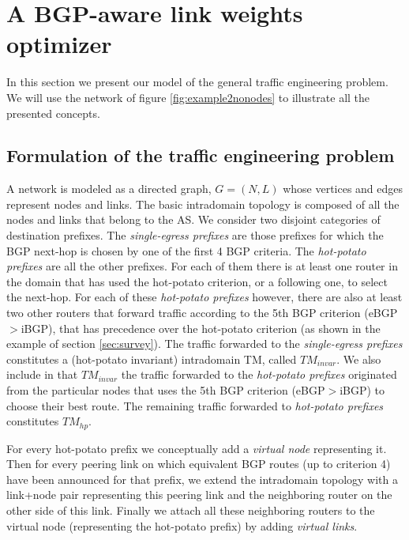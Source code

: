 \documentclass{acm_proc_article-sp}
\begin{document}
\section{A BGP-aware link weights optimizer}
\label{sec:method}

In this section we present our model of the general traffic
engineering problem. We will use the network of figure
\ref{fig:example2nonodes} to illustrate all the presented
concepts. 

\subsection{Formulation of the traffic engineering problem}

A network is modeled as a directed graph, $G = (N, L)$ whose vertices and edges
represent nodes and links. The basic intradomain topology is composed of all the
nodes and links that belong to the AS. 
We consider two disjoint categories of destination prefixes. 
The \textit{single-egress prefixes} are those prefixes for which the BGP next-hop 
is chosen by one of the first 4 BGP criteria. 
The \textit{hot-potato prefixes} are all the other prefixes. 
For each of them there is at least one router in the domain that has used the hot-potato criterion, 
or a following one, to select the next-hop. 
For each of these \textit{hot-potato prefixes} however, there are also
at least two other routers that forward traffic 
according to the 5th BGP criterion (eBGP$>$iBGP), that has precedence over the
hot-potato criterion (as shown in the example of section
\ref{sec:survey}). The traffic forwarded to the
\textit{single-egress prefixes} constitutes a (hot-potato invariant)
intradomain TM, called  $TM_{invar}$. We also include in that $TM_{invar}$ the
traffic forwarded to the \textit{hot-potato prefixes} originated from
the particular nodes that uses the 5th BGP criterion (eBGP$>$iBGP) to
choose their best route. The remaining traffic forwarded to
\textit{hot-potato prefixes} constitutes $TM_{hp}$.

For every hot-potato prefix we conceptually add a \textit{virtual node} representing it.
Then for every peering link on which equivalent BGP routes (up to criterion 4)
have been announced for that prefix, we extend the intradomain topology 
with a link+node pair representing 
this peering link and the neighboring router on the other side of this link.
Finally we attach all these neighboring routers to the virtual node (representing the hot-potato prefix) 
by adding \textit{virtual links}.
 
\end{document}
